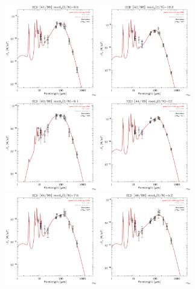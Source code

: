 \documentclass[preprint2,longabstract]{aastex}
\begin{document}
\begin{figure}
\centering
    \includegraphics[trim=0 2mm 0 0, clip, width=40mm]{../SEDs/sed_41.pdf}
	\includegraphics[trim=0 2mm 0 0, clip, width=40mm]{../SEDs/sed_42.pdf}
	\includegraphics[trim=0 2mm 0 0, clip, width=40mm]{../SEDs/sed_43.pdf}
	\includegraphics[trim=0 2mm 0 0, clip, width=40mm]{../SEDs/sed_44.pdf}
	\includegraphics[trim=0 2mm 0 0, clip, width=40mm]{../SEDs/sed_45.pdf}
	\includegraphics[trim=0 2mm 0 0, clip, width=40mm]{../SEDs/sed_46.pdf}

\end{figure}
\end{document}
